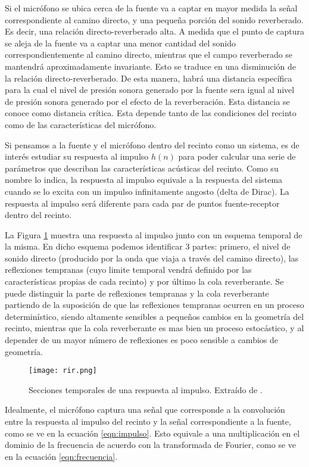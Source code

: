 Si el micrófono se ubica cerca de la fuente va a captar en mayor medida la señal correspondiente al camino directo, y una pequeña porción del sonido reverberado. Es decir, una relación directo-reverberado alta. A medida que el punto de captura se aleja de la fuente va a captar una menor cantidad del sonido correspondientemente al camino directo, mientras que el campo reverberado se mantendrá aproximadamente invariante. Esto se traduce en una disminución de la relación directo-reverberado. 
De esta manera, habrá una distancia específica para la cual el nivel de presión sonora generado por la fuente sera igual al nivel de presión sonora generado por el efecto de la reverberación. Esta distancia se conoce como distancia crítica. Esta depende tanto de las condiciones del recinto como de las características del micrófono. 

Si pensamos a la fuente y el micrófono dentro del recinto como un sistema, es de interés estudiar su respuesta al impulso $h(n)$ para poder calcular una serie de parámetros que describan las características acústicas del recinto. Como su nombre lo indica, la respuesta al impulso equivale a la respuesta del sistema cuando se lo excita con un impulso infinitamente angosto (delta de Dirac). La respuesta al impulso será diferente para cada par de puntos fuente-receptor dentro del recinto.   


La Figura \ref{fig:rir} muestra una respuesta al impulso junto con un esquema temporal de la misma. En dicho esquema podemos identificar 3 partes: primero, el nivel de sonido directo (producido por la onda que viaja a través del camino directo), las reflexiones tempranas (cuyo limite temporal vendrá definido por las características propias de cada recinto) y por último la cola reverberante. Se puede distinguir la parte de reflexiones tempranas y la cola reverberante partiendo de la suposición de que las reflexiones tempranas ocurren en un proceso determinístico, siendo altamente sensibles a pequeños cambios en la geometría del recinto, mientras que la cola reverberante es mas bien un proceso estocástico, y al depender de un mayor número de reflexiones es poco sensible a cambios de geometría. 

\begin{figure}[H]
  \centering{}
  \texttt{[image: rir.png]}
  \caption{Secciones temporales de una respuesta al impulso. Extraído de \cite{rir}.}
  \label{fig:rir}
\end{figure}

Idealmente, el micrófono captura una señal que corresponde a la convolución entre la respuesta al impulso del recinto y la señal correspondiente a la fuente, como se ve en la ecuación \ref{eqn:impulso}. Esto equivale a una multiplicación en el dominio de la frecuencia de acuerdo con la transformada de Fourier, como se ve en la ecuación \ref{eqn:frecuencia}.  


